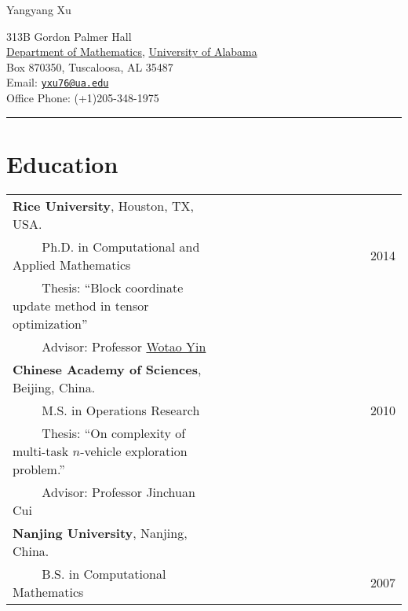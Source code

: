 \documentclass[letterpaper]{article}
\def\name{Yangyang Xu}
\begin{document}
{\Large \name}


\vspace{0.25in}

\begin{minipage}{0.99\linewidth}  
313B Gordon Palmer Hall   \\
\href{http://math.ua.edu}{Department of Mathematics}, \href{http://ua.edu/}{University of Alabama} \\
Box 870350, Tuscaloosa, AL 35487\\[0.2cm]
Email:  \href{mailto:yxu76@ua.edu}{\tt yxu76@ua.edu} \\
     Office Phone:  (+1)205-348-1975
\end{minipage}
  
    
\hrule


\section*{Education}

\begin{minipage}{1\linewidth}
\begin{tabular}{ll}
\textbf{Rice University}, Houston, TX, USA. & \\
~~~~ Ph.D. in Computational and Applied Mathematics  &~~~~~~~~~~~~~~~~~~~~~~~~2014\\
~~~~ Thesis: ``Block coordinate update method in tensor optimization'' &\\
~~~~ Advisor: Professor \href{http://www.math.ucla.edu/~wotaoyin/}{Wotao Yin} &\\[0.1cm]

\textbf{Chinese Academy of Sciences}, Beijing, China.\\
~~~~ M.S. in Operations Research &~~~~~~~~~~~~~~~~~~~~~~~~2010\\
~~~~ Thesis: ``On complexity of multi-task $n$-vehicle exploration problem.''& \\
~~~~ Advisor: Professor Jinchuan Cui &\\[0.1cm]

\textbf{Nanjing University}, Nanjing, China.& \\
~~~~ B.S. in Computational Mathematics  & ~~~~~~~~~~~~~~~~~~~~~~~~2007\\
\end{tabular}
\end{minipage}
\end{document}
